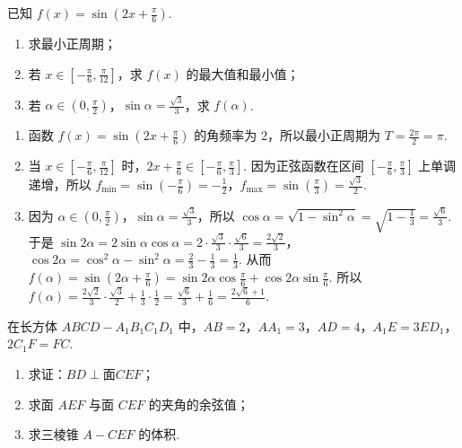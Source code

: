 \begin{problem}
已知 \(f(x)=\sin \left( 2x+\frac{\pi}{6} \right)\).

\begin{enumerate}
\item 求最小正周期；
\item 若 \(x\in \left[ -\frac{\pi}{6},\frac{\pi}{12} \right]\)，求 \(f(x)\) 的最大值和最小值；
\item 若 \(\alpha\in \left( 0,\frac{\pi}{2} \right)\)，\(\sin \alpha=\frac{\sqrt{3}}{3}\)，求 \(f(\alpha)\).
\end{enumerate}
\end{problem}

\begin{solution}
\begin{enumerate}
\item 函数 \(f(x)=\sin \left( 2x+\frac{\pi}{6} \right)\) 的角频率为 \(2\)，所以最小正周期为 \(T=\frac{2\pi}{2}=\pi\).

\item 当 \(x\in \left[ -\frac{\pi}{6},\frac{\pi}{12} \right]\) 时，\(2x+\frac{\pi}{6}\in \left[ -\frac{\pi}{6},\frac{\pi}{3} \right]\). 因为正弦函数在区间 \(\left[ -\frac{\pi}{6},\frac{\pi}{3} \right]\) 上单调递增，所以 \(f_{\min}=\sin \left( -\frac{\pi}{6} \right)=-\frac{1}{2}\)，\(f_{\max}=\sin \left( \frac{\pi}{3} \right)=\frac{\sqrt{3}}{2}\).

\item 因为 \(\alpha\in \left( 0,\frac{\pi}{2} \right)\)，\(\sin \alpha=\frac{\sqrt{3}}{3}\)，所以 \(\cos \alpha=\sqrt{1-\sin^2 \alpha}=\sqrt{1-\frac{1}{3}}=\frac{\sqrt{6}}{3}\). 于是 \(\sin 2\alpha=2\sin \alpha \cos \alpha=2\cdot \frac{\sqrt{3}}{3}\cdot \frac{\sqrt{6}}{3}=\frac{2\sqrt{2}}{3}\)，\(\cos 2\alpha=\cos^2 \alpha-\sin^2 \alpha=\frac{2}{3}-\frac{1}{3}=\frac{1}{3}\). 从而 \(f(\alpha)=\sin \left( 2\alpha+\frac{\pi}{6} \right)=\sin 2\alpha \cos \frac{\pi}{6}+\cos 2\alpha \sin \frac{\pi}{6}\). 所以 \(f(\alpha)=\frac{2\sqrt{2}}{3}\cdot \frac{\sqrt{3}}{2}+\frac{1}{3}\cdot \frac{1}{2}=\frac{\sqrt{6}}{3}+\frac{1}{6}=\frac{2\sqrt{6}+1}{6}\).
\end{enumerate}
\end{solution}

\begin{problem}
在长方体 \(ABCD-A_1B_1C_1D_1\) 中，\(AB=2\)，\(AA_1=3\)，\(AD=4\)，\(A_1E=3ED_1\)，\(2C_1F=FC\).

\begin{enumerate}
\item 求证：\(BD\perp \text{面} CEF\)；
\item 求面 \(AEF\) 与面 \(CEF\) 的夹角的余弦值；
\item 求三棱锥 \(A-CEF\) 的体积.
\end{enumerate}

\end{problem}

